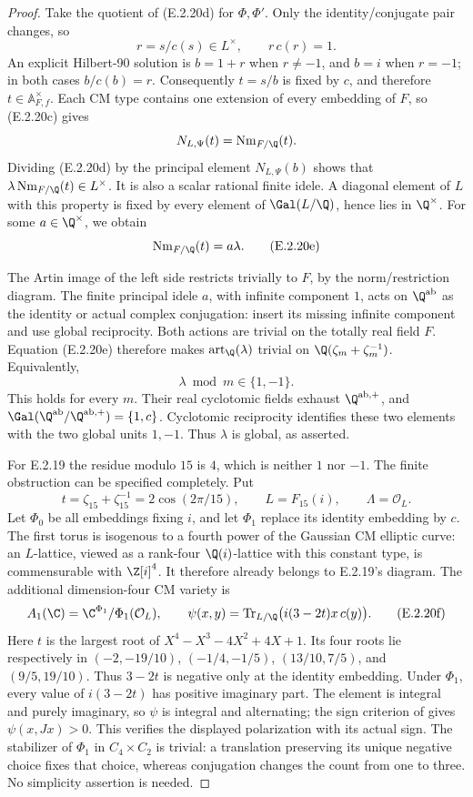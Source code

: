 \begin{proof}
Take the quotient of (E.2.20d) for \(\Phi,\Phi'\).
Only the identity/conjugate pair changes, so
\[
 r=s/c(s)\in L^\times,\qquad r\,c(r)=1.
\]
An explicit Hilbert-90 solution is
\(b=1+r\) when \(r\ne-1\), and \(b=i\) when \(r=-1\);
in both cases \(b/c(b)=r\).
Consequently \(t=s/b\) is fixed by \(c\), and therefore
\(t\in\mathbb A_{F,f}^{\times}\).
Each CM type contains one extension of every embedding
of \(F\), so (E.2.20c) gives
\[
 N_{L,\Psi}(t)=\operatorname{Nm}_{F/\Q}(t).
\]
Dividing (E.2.20d) by the principal element
\(N_{L,\Psi}(b)\) shows that
\(\lambda\operatorname{Nm}_{F/\Q}(t)\in L^\times\).
It is also a scalar rational finite idele. A diagonal
element of \(L\) with this property is fixed by every
element of \(\Gal(L/\Q)\), hence lies in \(\Q^\times\).
For some \(a\in\Q^\times\), we obtain
\[
 \operatorname{Nm}_{F/\Q}(t)=a\lambda.
 \tag{E.2.20e}
\]

The Artin image of the left side restricts trivially
to \(F\), by the norm/restriction diagram.
The finite principal idele \(a\), with infinite
component \(1\), acts on \(\Q^{\mathrm{ab}}\) as
the identity or actual complex conjugation:
insert its missing infinite component and use
global reciprocity. Both actions are trivial on
the totally real field \(F\).
Equation (E.2.20e) therefore makes
\(\operatorname{art}_{\Q}(\lambda)\) trivial on
\(\Q(\zeta_m+\zeta_m^{-1})\). Equivalently,
\[
 \lambda\bmod m\in\{1,-1\}.
\]
This holds for every \(m\). Their real cyclotomic
fields exhaust \(\Q^{\mathrm{ab},+}\), and
\(\Gal(\Q^{\mathrm{ab}}/\Q^{\mathrm{ab},+})
=\{1,c\}\). Cyclotomic reciprocity identifies these
two elements with the two global units \(1,-1\).
Thus \(\lambda\) is global, as asserted.

For E.2.19 the residue modulo \(15\) is \(4\), which
is neither \(1\) nor \(-1\). The finite obstruction
can be specified completely. Put
\[
 t=\zeta_{15}+\zeta_{15}^{-1}
   =2\cos(2\pi/15),\qquad L=F_{15}(i),\qquad
 \Lambda=\mathcal O_L.
\]
Let \(\Phi_0\) be all embeddings fixing \(i\), and let
\(\Phi_1\) replace its identity embedding by \(c\).
The first torus is isogenous to a fourth power of
the Gaussian CM elliptic curve: an \(L\)-lattice,
viewed as a rank-four \(\Q(i)\)-lattice with this
constant type, is commensurable with \(\Z[i]^4\).
It therefore already belongs to E.2.19's diagram.
The additional dimension-four CM variety is
\[
 A_1(\C)=\C^{\Phi_1}/\Phi_1(\mathcal O_L),\qquad
 \psi(x,y)=\operatorname{Tr}_{L/\Q}
       \bigl(i(3-2t)x\,c(y)\bigr).
 \tag{E.2.20f}
\]
Here \(t\) is the largest root of
\(X^4-X^3-4X^2+4X+1\). Its four roots lie respectively
in \((-2,-19/10)\), \((-1/4,-1/5)\),
\((13/10,7/5)\), and \((9/5,19/10)\).
Thus \(3-2t\) is negative only at the identity
embedding. Under \(\Phi_1\), every value of
\(i(3-2t)\) has positive imaginary part.
The element is integral and purely imaginary, so
\(\psi\) is integral and alternating; the sign
criterion of \cite[Example 2.9, pp.~25--26]{GenMilneCM2020}
gives \(\psi(x,Jx)>0\). This verifies the displayed
polarization with its actual sign.
The stabilizer of \(\Phi_1\) in \(C_4\times C_2\)
is trivial: a translation preserving its unique
negative choice fixes that choice, whereas
conjugation changes the count from one to three.
No simplicity assertion is needed.


\end{proof}
